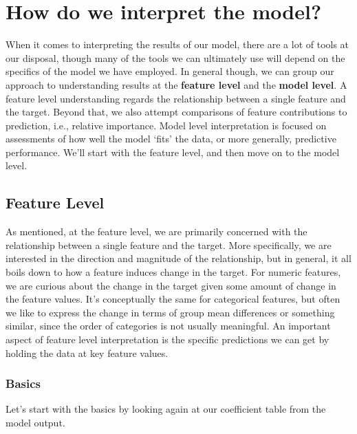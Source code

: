 \documentclass[
  letterpaper,
]{krantz}
\begin{document}
\section{How do we interpret the model?}\label{sec-lm-interpretation}

When it comes to interpreting the results of our model, there are a lot
of tools at our disposal, though many of the tools we can ultimately use
will depend on the specifics of the model we have employed. In general
though, we can group our approach to understanding results at the
\textbf{feature level} and the \textbf{model level}. A feature level
understanding regards the relationship between a single feature and the
target. Beyond that, we also attempt comparisons of feature
contributions to prediction, i.e., relative importance. Model level
interpretation is focused on assessments of how well the model `fits'
the data, or more generally, predictive performance. We'll start with
the feature level, and then move on to the model level.

\subsection{Feature Level}\label{sec-lm-interpretation-feature}

As mentioned, at the feature level, we are primarily concerned with the
relationship between a single feature and the target. More specifically,
we are interested in the direction and magnitude of the relationship,
but in general, it all boils down to how a feature induces change in the
target. For numeric features, we are curious about the change in the
target given some amount of change in the feature values. It's
conceptually the same for categorical features, but often we like to
express the change in terms of group mean differences or something
similar, since the order of categories is not usually meaningful. An
important aspect of feature level interpretation is the specific
predictions we can get by holding the data at key feature values.

\subsubsection{Basics}\label{basics}

Let's start with the basics by looking again at our coefficient table
from the model output.

\small
\end{document}
